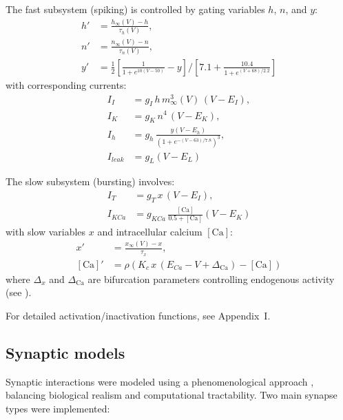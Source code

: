 \documentclass[nofootinbib,aip,amsmath,amssymb,reprint,twocolumn,10pt]{revtex4-2}
\begin{document}
The fast subsystem (spiking) is controlled by gating variables $h$, $n$, and $y$:
\begin{align}
h' &= \frac{h_\infty(V) - h}{\tau_h(V)}, \\
n' &= \frac{n_\infty(V) - n}{\tau_n(V)}, \\
y' &= \frac{1}{2} \left[ \frac{1}{1 + e^{10(V-50)}} - y \right] / \left[ 7.1 + \frac{10.4}{1 + e^{(V+68)/2.2}} \right]
\end{align}
with corresponding currents:
\begin{align}
I_{I} &= g_{I}\, h\, m_\infty^3(V)\, (V-E_{I}), \\
I_K &= g_K\, n^4\, (V-E_K), \\
I_h &= g_h\, \frac{y (V-E_h)}{(1 + e^{-(V-63)/7.8})^3}, \\
I_{leak} &= g_L (V-E_L)
\end{align}

The slow subsystem (bursting) involves:
\begin{align}
I_{T} &= g_{T}\, x\, (V-E_{I}), \\
I_{KCa} &= g_{KCa}\, \frac{[\mathrm{Ca}]}{0.5 + [\mathrm{Ca}]} (V-E_K)
\end{align}
with slow variables $x$ and intracellular calcium $[\mathrm{Ca}]$:
\begin{align}
x' &= \frac{x_\infty(V) - x}{\tau_x}, \\
[\mathrm{Ca}]' &= \rho \left( K_c\, x\, (E_{Ca} - V + \Delta_{\mathrm{Ca}}) - [\mathrm{Ca}] \right)
\end{align}
where $\Delta_x$ and $\Delta_{\mathrm{Ca}}$ are bifurcation parameters controlling endogenous activity (see \cite{scully2024pairing}).

For detailed activation/inactivation functions, see Appendix~I.

\subsection{Synaptic models}

Synaptic interactions were modeled using a phenomenological approach \cite{scully2024pairing}, balancing biological realism and computational tractability. Two main synapse types were implemented:
\end{document}

